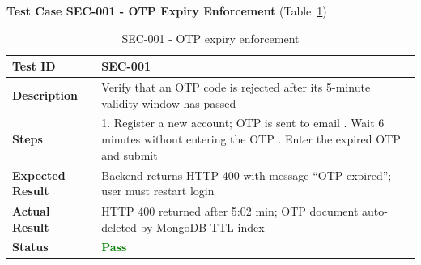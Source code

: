 \textbf{Test Case SEC-001 - OTP Expiry Enforcement} (Table~\ref{tab:sec001})
\begin{table}[H]
\caption{SEC-001 - OTP expiry enforcement}
\centering
\begin{tabular}{|l|p{10cm}|}
\hline
\textbf{Test ID} & SEC-001 \\
\hline
\textbf{Description} & Verify that an OTP code is rejected after its 5-minute validity window has passed \\
\hline
\textbf{Steps} &
1. Register a new account; OTP is sent to email \newline
2. Wait 6 minutes without entering the OTP \newline
3. Enter the expired OTP and submit \\
\hline
\textbf{Expected Result} & Backend returns HTTP 400 with message ``OTP expired''; user must restart login \\
\hline
\textbf{Actual Result} & HTTP 400 returned after 5:02 min; OTP document auto-deleted by MongoDB TTL index \\
\hline
\textbf{Status} & \textcolor{green}{\textbf{Pass}} \\
\hline
\end{tabular}

\label{tab:sec001}
\end{table}


